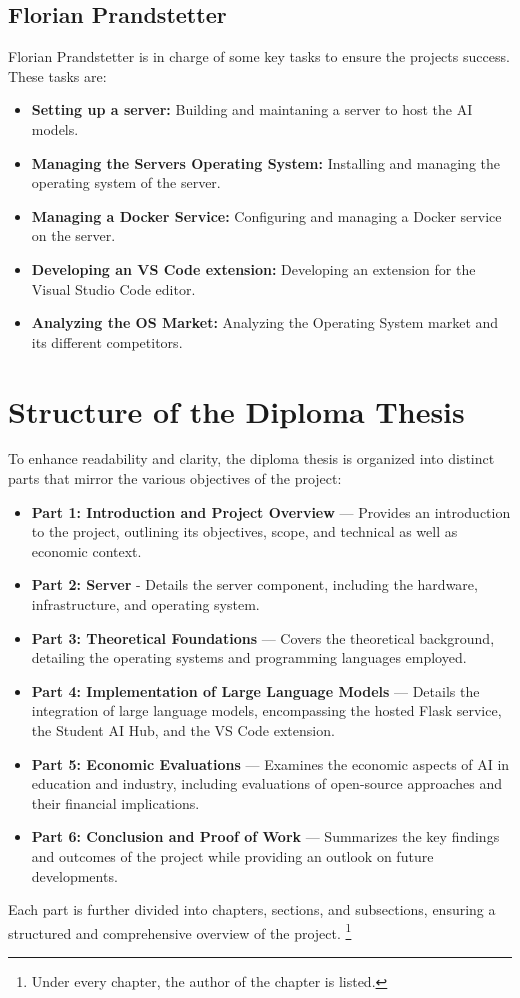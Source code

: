 \subsection{Florian Prandstetter}
\label{sec:Florina-Prandstetter}

Florian Prandstetter is in charge of some key tasks to ensure the projects success.
These tasks are:

\begin{itemize}
    \item \textbf{Setting up a server:} Building and maintaning a server to host the AI models.
    \item \textbf{Managing the Servers Operating System:} Installing and managing the operating system of the server.
    \item \textbf{Managing a Docker Service:} Configuring and managing a Docker service on the server.
    \item \textbf{Developing an VS Code extension:} Developing an extension for the Visual Studio Code editor.
    \item \textbf{Analyzing the OS Market:} Analyzing the Operating System market and its different competitors.
\end{itemize}

\section{Structure of the Diploma Thesis}

To enhance readability and clarity, the diploma thesis is organized into distinct parts that mirror the various objectives of the project:

\begin{itemize}
    \item \textbf{Part 1: Introduction and Project Overview} — Provides an introduction to the project, outlining its objectives, scope, and technical as well as economic context.
    \item \textbf{Part 2: Server} - Details the server component, including the hardware, infrastructure, and operating system.
    \item \textbf{Part 3: Theoretical Foundations} — Covers the theoretical background, detailing the operating systems and programming languages employed.
    \item \textbf{Part 4: Implementation of Large Language Models} — Details the integration of large language models, encompassing the hosted Flask service, the Student AI Hub, and the VS Code extension.
    \item \textbf{Part 5: Economic Evaluations} — Examines the economic aspects of AI in education and industry, including evaluations of open-source approaches and their financial implications.
    \item \textbf{Part 6: Conclusion and Proof of Work} — Summarizes the key findings and outcomes of the project while providing an outlook on future developments.
\end{itemize}

Each part is further divided into chapters, sections, and subsections, ensuring a structured and comprehensive overview of the project.
\footnote{Under every chapter, the author of the chapter is listed.}

